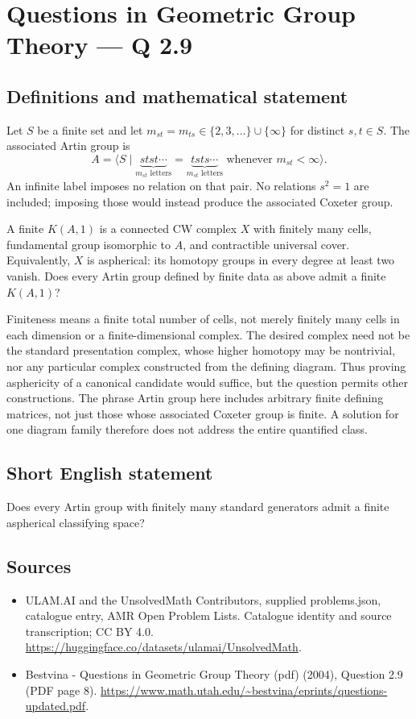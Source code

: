 \documentclass[11pt,a4paper]{article}
\begin{document}
\section*{Questions in Geometric Group Theory — Q 2.9}\label{statement}

\subsection{Definitions and mathematical statement}
Let $S$ be a finite set and let $m_{st}=m_{ts}\in\{2,3,\ldots\}\cup\{\infty\}$ for distinct $s,t\in S$. The associated Artin group is
\[
 A=\langle S\mid
 \underbrace{stst\cdots}_{m_{st}\text{ letters}}
 =\underbrace{tsts\cdots}_{m_{st}\text{ letters}}
 \text{ whenever }m_{st}<\infty\rangle.
\]
An infinite label imposes no relation on that pair. No relations $s^2=1$ are included; imposing those would instead produce the associated Coxeter group.

A finite $K(A,1)$ is a connected CW complex $X$ with finitely many cells, fundamental group isomorphic to $A$, and contractible universal cover. Equivalently, $X$ is aspherical: its homotopy groups in every degree at least two vanish. Does every Artin group defined by finite data as above admit a finite $K(A,1)$?

Finiteness means a finite total number of cells, not merely finitely many cells in each dimension or a finite-dimensional complex. The desired complex need not be the standard presentation complex, whose higher homotopy may be nontrivial, nor any particular complex constructed from the defining diagram. Thus proving asphericity of a canonical candidate would suffice, but the question permits other constructions. The phrase Artin group here includes arbitrary finite defining matrices, not just those whose associated Coxeter group is finite. A solution for one diagram family therefore does not address the entire quantified class.
\subsection{Short English statement}
Does every Artin group with finitely many standard generators admit a finite aspherical classifying space?
\subsection{Sources}
\begin{itemize}
\item[S1] ULAM.AI and the UnsolvedMath Contributors, supplied problems.json, catalogue entry, AMR Open Problem Lists. Catalogue identity and source transcription; CC BY 4.0.
\url{https://huggingface.co/datasets/ulamai/UnsolvedMath}.
\item[S2] Bestvina - Questions in Geometric Group Theory (pdf) (2004), Question 2.9 (PDF page 8). 
\url{https://www.math.utah.edu/~bestvina/eprints/questions-updated.pdf}.
\end{itemize}
\end{document}
